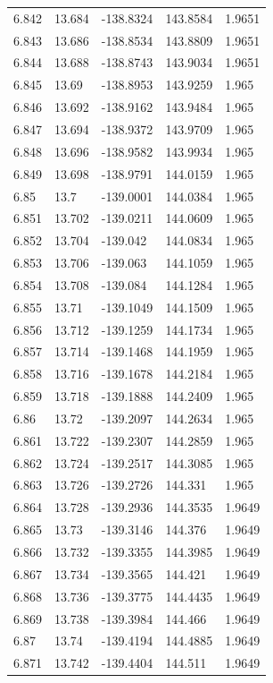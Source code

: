 \begin{tabular}{lllll}
6.842 & 13.684 & -138.8324 & 143.8584 & 1.9651 \\
6.843 & 13.686 & -138.8534 & 143.8809 & 1.9651 \\
6.844 & 13.688 & -138.8743 & 143.9034 & 1.9651 \\
6.845 & 13.69 & -138.8953 & 143.9259 & 1.965 \\
6.846 & 13.692 & -138.9162 & 143.9484 & 1.965 \\
6.847 & 13.694 & -138.9372 & 143.9709 & 1.965 \\
6.848 & 13.696 & -138.9582 & 143.9934 & 1.965 \\
6.849 & 13.698 & -138.9791 & 144.0159 & 1.965 \\
6.85 & 13.7 & -139.0001 & 144.0384 & 1.965 \\
6.851 & 13.702 & -139.0211 & 144.0609 & 1.965 \\
6.852 & 13.704 & -139.042 & 144.0834 & 1.965 \\
6.853 & 13.706 & -139.063 & 144.1059 & 1.965 \\
6.854 & 13.708 & -139.084 & 144.1284 & 1.965 \\
6.855 & 13.71 & -139.1049 & 144.1509 & 1.965 \\
6.856 & 13.712 & -139.1259 & 144.1734 & 1.965 \\
6.857 & 13.714 & -139.1468 & 144.1959 & 1.965 \\
6.858 & 13.716 & -139.1678 & 144.2184 & 1.965 \\
6.859 & 13.718 & -139.1888 & 144.2409 & 1.965 \\
6.86 & 13.72 & -139.2097 & 144.2634 & 1.965 \\
6.861 & 13.722 & -139.2307 & 144.2859 & 1.965 \\
6.862 & 13.724 & -139.2517 & 144.3085 & 1.965 \\
6.863 & 13.726 & -139.2726 & 144.331 & 1.965 \\
6.864 & 13.728 & -139.2936 & 144.3535 & 1.9649 \\
6.865 & 13.73 & -139.3146 & 144.376 & 1.9649 \\
6.866 & 13.732 & -139.3355 & 144.3985 & 1.9649 \\
6.867 & 13.734 & -139.3565 & 144.421 & 1.9649 \\
6.868 & 13.736 & -139.3775 & 144.4435 & 1.9649 \\
6.869 & 13.738 & -139.3984 & 144.466 & 1.9649 \\
6.87 & 13.74 & -139.4194 & 144.4885 & 1.9649 \\
6.871 & 13.742 & -139.4404 & 144.511 & 1.9649 \\

\end{tabular}
